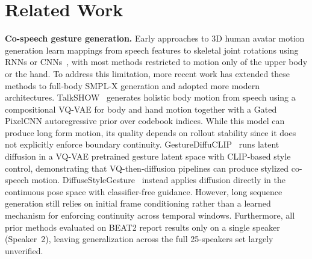 \section{Related Work}
\label{sec:related}
\noindent \textbf{Co-speech gesture generation.}
Early approaches to 3D human avatar motion generation learn mappings from speech features to skeletal joint rotations using RNNs or CNNs~\cite{s2g,trimodal,ha2g,habibie}, with most methods restricted to motion only of the upper body or the hand.
To address this limitation, more recent work has extended these methods to full-body SMPL-X generation and adopted more modern architectures.
TalkSHOW~\cite{talkshow2023} generates holistic body motion from speech using a compositional VQ-VAE for body and hand motion together with a Gated PixelCNN autoregressive prior over codebook indices.
While this model can produce long form motion, its quality depends on rollout stability since it does not explicitly enforce boundary continuity.
GestureDiffuCLIP~\cite{gesturediffuclip} runs latent diffusion in a VQ-VAE pretrained gesture latent space with CLIP-based style control, demonstrating that VQ-then-diffusion pipelines can produce stylized co-speech motion.
DiffuseStyleGesture~\cite{diffusestylegesture2023} instead applies diffusion directly in the continuous pose space with classifier-free guidance.
However, long sequence generation still relies on initial frame conditioning rather than a learned mechanism for enforcing continuity across temporal windows.
Furthermore, all prior methods evaluated on BEAT2 report results only on a single speaker (Speaker~2), leaving generalization across the full 25-speakers set largely unverified.

